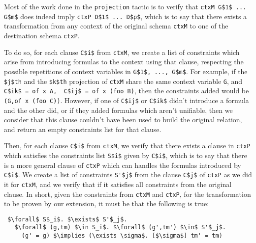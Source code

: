 \documentclass[nocopyrightspace,authoryear]{sigplanconf}
\begin{document}
Most of the work done in the \lstinline|projection| tactic is to verify that \lstinline|ctxM G$1$ ... G$m$| does indeed imply \lstinline|ctxP D$1$ ... D$p$|, which is to say that there exists a transformation from any context of the original schema \lstinline|ctxM| to one of the destination schema \lstinline|ctxP|.

To do so, for each clause \lstinline|C$i$| from \lstinline|ctxM|, we create a list of constraints which arise from introducing formulas to the context using that clause, respecting the possible repetitions of context variables in \lstinline|G$1$, ..., G$m$|. For example, if the \lstinline|$j$th| and the \lstinline|$k$th| projection of \lstinline|ctxM| share the same context variable \lstinline|G|, and \lstinline|C$ik$ = of x A,  C$ij$ = of x (foo B)|, then the constraints added would be \lstinline|(G,of x (foo C))|. However, if one of \lstinline|C$ij$| or \lstinline|C$ik$| didn't introduce a formula and the other did, or if they added formulas which aren't unifiable, then we consider that this clause couldn't have been used to build the original relation, and return an empty constraints list for that clause.

Then, for each clause \lstinline|C$i$| from \lstinline|ctxM|, we verify that there exists a clause in \lstinline|ctxP| which satisfies the constraints list \lstinline|S$i$| given by \lstinline|C$i$|, which is to say that there is a more general clause of \lstinline|ctxP| which can handles the formulas introduced by \lstinline|C$i$|. We create a list of constraints \lstinline|S'$j$| from the clause \lstinline|C$j$| of \lstinline|ctxP| as we did it for \lstinline|ctxM|, and we verify that if it satisfies all constraints from the original clause. In short, given the constraints from \lstinline|ctxM| and \lstinline|ctxP|, for the transformation to be proven by our extension, it must be that the following is true:
\begin{lstlisting}
 $\forall$ S$_i$. $\exists$ S'$_j$. 
   $\forall$ (g,tm) $\in S_i$. $\forall$ (g',tm') $\in$ S'$_j$. 
     (g' = g) $\implies (\exists \sigma$. [$\sigma$] tm' = tm)
\end{lstlisting}



\begin{comment}
2:
To do so, for every \lstinline|D$i$ $\in$ D$1$, ..., D$p$|, we form the set 
\lstinline|S$_{i}$: { G$k$ $\mid$ D$i$ = G$k$ $\wedge$ G$k$ $\in$ G$1$, ..., G$m$}|. 
Then, for each such \lstinline|S$_i$| and for each clause \lstinline|C$j$| in the original schema \lstinline|ctxM|, we unify, for each \lstinline|G$k$ $\in$ S$_i$|, \lstinline|C$jk$| together as \lstinline|CR$ij$| , and verify that there exists a clause \lstinline|C'$l$| in the destination schema \lstinline|ctxP| such that \lstinline|CR$ij$| matches \lstinline|C'$li$|.
\end{comment}
\end{document}
